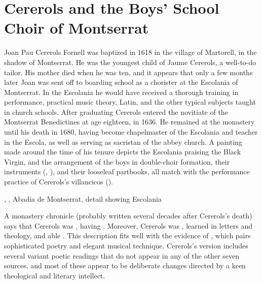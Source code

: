 
\section{Cererols and the Boys' School Choir of Montserrat}

Joan Pau Cererols Fornell was baptized in 1618 in the village of Martorell, in
the shadow of Montserrat.%
    \Autocite{Balanza:CererolsFamily}
He was the youngest child of Jaume Cererols, a well-to-do tailor.
His mother died when he was ten, and it appears that only a few months later
Joan was sent off to boarding school as a chorister at the Escolania of
Montserrat.
In the Escolania he would have received a thorough training in performance,
practical music theory, Latin, and the other typical subjects taught in church
schools.
After graduating Cererols entered the novitiate of the Montserrat Benedictines
at age eighteen, in 1636.
He remained at the monastery until his death in 1680, having become chapelmaster
of the Escolania and teacher in the Escola, as well as serving as sacristan of
the abbey church.
A painting made around the time of his tenure depicts the Escolania praising
the Black Virgin, and the arrangement of the boys in double-choir formation,
their instruments (, ), and their looseleaf
partbooks, all match with the performance practice of Cererols's villancicos
().%
    \Autocite[34]{Laplana:MontserratMuseu}


{, , Abadia de Montserrat, detail
showing Escolania}

A monastery chronicle (probably written several decades after Cererols's death)
says that Cererols was , having .
Moreover, Cererols was , learned in letters and
theology, and able .%
    \Autocite[7, note 2]{Estrada:CererolsBio}
This description fits well with the evidence of ,
which pairs sophisticated poetry and elegant musical technique.
Cererols's version includes several variant poetic readings that do not appear
in any of the other seven sources, and most of these appear to be deliberate
changes directed by a keen theological and literary intellect.

